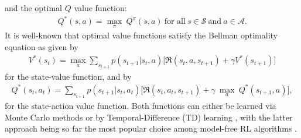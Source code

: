 and the optimal $Q$ value function:
\begin{align}
Q^{*}(s,a)= \underset{\pi}{\max}\:Q^{\pi}(s,a) \ \text{for all} \ s\in\mathcal{S} \ \text{and} \ a \in\mathcal{A}.
\end{align}
It is well-known that optimal value functions satisfy the Bellman optimality equation as given by
\begin{align}
    V^{*}(s_t) = \underset{a}{\max}\sum_{s_{t+1}}p(s_{t+1} | s_{t}, a) \bigg[\Re (s_{t}, a, s_{t+1}) + \gamma V^{*}(s_{t+1}) \bigg]
\end{align}
for the state-value function, and by
\begin{multline}
    Q^{*}(s_t,a_t)=\sum_{s_{t+1}}p(s_{t+1} | s_{t}, a_{t})  \bigg[\Re (s_{t}, a_{t}, s_{t+1}) + \gamma \: \underset{a}{\max} \: Q^{*}(s_{t+1}, a) \bigg],
\end{multline}
for the state-action value function. Both functions can either be learned via Monte Carlo methods or by Temporal-Difference (TD) learning \cite{sutton1988learning}, with the latter approach being so far the most popular choice among model-free RL algorithms \cite{watkins1992q, rummery1994line, hasselt2010double}. %

